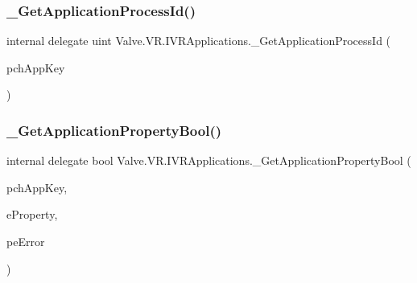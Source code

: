 \subsubsection{\texorpdfstring{\_GetApplicationProcessId()}{\_GetApplicationProcessId()}}
{\footnotesize\ttfamily internal delegate uint Valve.\+V\+R.\+I\+V\+R\+Applications.\+\_\+\+Get\+Application\+Process\+Id (\begin{DoxyParamCaption}\item[{string}]{pch\+App\+Key }\end{DoxyParamCaption})}

\mbox{\label{struct_valve_1_1_v_r_1_1_i_v_r_applications_ae970669423f2d1c534e4268eb4421841}} 
\subsubsection{\texorpdfstring{\_GetApplicationPropertyBool()}{\_GetApplicationPropertyBool()}}
{\footnotesize\ttfamily internal delegate bool Valve.\+V\+R.\+I\+V\+R\+Applications.\+\_\+\+Get\+Application\+Property\+Bool (\begin{DoxyParamCaption}\item[{string}]{pch\+App\+Key,  }\item[{\mbox{\hyperlink{namespace_valve_1_1_v_r_a60802f09ad1b4764cd5bc78369d50bf3}{E\+V\+R\+Application\+Property}}}]{e\+Property,  }\item[{ref \mbox{\hyperlink{namespace_valve_1_1_v_r_a3488adab8a219b579fcee50f4e63a8b6}{E\+V\+R\+Application\+Error}}}]{pe\+Error }\end{DoxyParamCaption})}

\mbox{\label{struct_valve_1_1_v_r_1_1_i_v_r_applications_a29be5eea80ac523877cbc8596f8b6f34}} 
